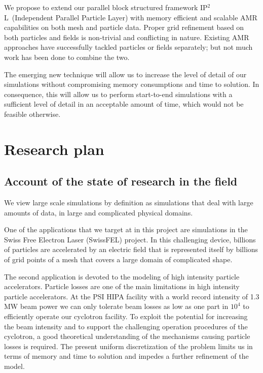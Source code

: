 \documentclass[11pt,pdftex]{article}
\renewcommand{\ippl}{\textsc{IP$^{2}$L}}
\begin{document}
We propose to extend our parallel block structured framework \ippl\
(Independent Parallel Particle Layer) with memory efficient and scalable
AMR capabilities on both mesh and particle data.  Proper grid refinement
based on both particles and fields is non-trivial and conflicting in
nature.  Existing AMR approaches have successfully tackled particles or
fields separately; but not much work has been done to combine the two.
  
The emerging new technique will allow us to increase the level of detail
of our simulations without compromising memory consumptions and time to
solution.  In consequence, this will allow us to perform start-to-end
simulations with a sufficient level of detail in an acceptable amount of
time, which would not be feasible otherwise.
   

\section{Research plan}
\label{sec:research_plan}

\subsection{Account of the state of research in the field}

We view large scale simulations by definition as simulations that deal
with large amounts of data, in large and complicated physical domains.

One of the applications that we target at in this project are
simulations in the Swiss Free Electron Laser (SwissFEL) project.  In this
challenging device, billions of particles are accelerated by an electric
field that is represented itself by billions of grid points of a mesh
that covers a large domain of complicated shape.

The second application is devoted to the modeling of high intensity
particle accelerators.  Particle losses are one of the main limitations
in high intensity particle accelerators. At the PSI HIPA facility with a
world record intensity of 1.3 MW beam power we can only tolerate beam
losses as low as one part in $10^4$ to efficiently operate our cyclotron
facility.  To exploit the potential for increasing the beam intensity
and to support the challenging operation procedures of the cyclotron, a
good theoretical understanding of the mechanisms causing particle losses
is required.  The present uniform discretization of the problem limits
us in terms of memory and time to solution and impedes a further
refinement of the model.
\end{document}
